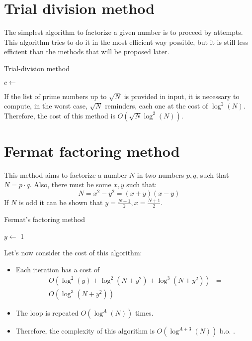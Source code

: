 \section{Trial division method}
The simplest algorithm to factorize a given number is to proceed by attempts. \newline
This algorithm tries to do it in the most efficient way possible, but it is still less efficient than the methods that will be proposed later.
\begin{algorithm}
\caption{Trial-division method}\label{alg:trial_division_method}
$c \gets$ \;
\;
\end{algorithm}
If the list of prime numbers up to $\sqrt{N}$ is provided in input, it is necessary to compute, in the worst case, $\sqrt{N}$ reminders, each one at the cost of $\operatorname{log}^{2}(N)$. \newline
Therefore, the cost of this method is $O(\sqrt{N} \operatorname{log}^{2}(N))$.

\section{Fermat factoring method}
This method aims to factorize a number $N$ in two numbers $p, q$, such that $N = p \cdot q$. Also, there must be some $x,y$ such that:
\[
N = x^{2} - y^{2} = (x + y)(x - y)
\]
If $N$ is odd it can be shown that $y = \frac{N - 1}{2}, x = \frac{N + 1}{2}$.

\begin{algorithm}
\caption{Fermat's factoring method}\label{alg:fermat_factoring_method}
$y \gets$ 1\;
\end{algorithm}

Let's now consider the cost of this algorithm:
\begin{itemize}
    \item Each iteration has a cost of
    \begin{align*}
        O(\operatorname{log}^{2}(y) + \operatorname{log}^{2}(N + y^{2}) + \operatorname{log}^{3}(N + y^{2})) & = \\
        O(\operatorname{log}^{3}(N + y^{2}))
    \end{align*}
    \item The loop is repeated $O(\operatorname{log}^{A}(N))$ times.
    \item Therefore, the complexity of this algorithm is $O(\operatorname{log}^{A + 3}(N))$ b.o. .
\end{itemize}

